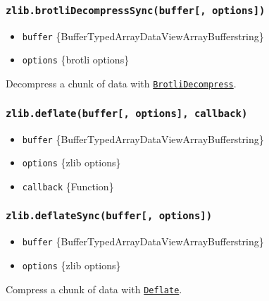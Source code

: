 \subsubsection{\texorpdfstring{\texttt{zlib.brotliDecompressSync(buffer{[},\ options{]})}}{zlib.brotliDecompressSync(buffer{[}, options{]})}}\label{zlib.brotlidecompresssyncbuffer-options}

\begin{itemize}
\tightlist
\item
  \texttt{buffer}
  \{Buffer\textbar TypedArray\textbar DataView\textbar ArrayBuffer\textbar string\}
\item
  \texttt{options} \{brotli options\}
\end{itemize}

Decompress a chunk of data with
\hyperref[class-zlibbrotlidecompress]{\texttt{BrotliDecompress}}.

\subsubsection{\texorpdfstring{\texttt{zlib.deflate(buffer{[},\ options{]},\ callback)}}{zlib.deflate(buffer{[}, options{]}, callback)}}\label{zlib.deflatebuffer-options-callback}

\begin{itemize}
\tightlist
\item
  \texttt{buffer}
  \{Buffer\textbar TypedArray\textbar DataView\textbar ArrayBuffer\textbar string\}
\item
  \texttt{options} \{zlib options\}
\item
  \texttt{callback} \{Function\}
\end{itemize}

\subsubsection{\texorpdfstring{\texttt{zlib.deflateSync(buffer{[},\ options{]})}}{zlib.deflateSync(buffer{[}, options{]})}}\label{zlib.deflatesyncbuffer-options}

\begin{itemize}
\tightlist
\item
  \texttt{buffer}
  \{Buffer\textbar TypedArray\textbar DataView\textbar ArrayBuffer\textbar string\}
\item
  \texttt{options} \{zlib options\}
\end{itemize}

Compress a chunk of data with
\hyperref[class-zlibdeflate]{\texttt{Deflate}}.

